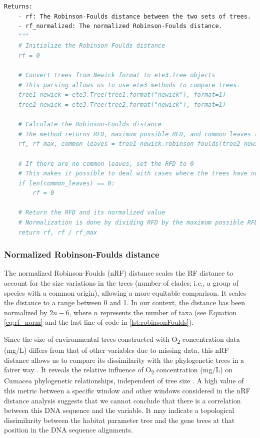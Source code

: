 {\begin{lstlisting}[label=lst:robinsonFoulds,language=Python,caption=Python script for calculating the Robinson-Foulds Distance using the ete3 package in the aPhyloGeo package.]
    Returns:
    - rf: The Robinson-Foulds distance between the two sets of trees.
    - rf_normalized: The normalized Robinson-Foulds distance.
    """
    # Initialize the Robinson-Foulds distance
    rf = 0

    # Convert trees from Newick format to ete3.Tree objects
    # This parsing allows us to use ete3 methods to compare trees.
    tree1_newick = ete3.Tree(tree1.format("newick"), format=1)
    tree2_newick = ete3.Tree(tree2.format("newick"), format=1)

    # Calculate the Robinson-Foulds distance
    # The method returns RFD, maximum possible RFD, and common leaves (i.e., a taxa) between the trees.
    rf, rf_max, common_leaves = tree1_newick.robinson_foulds(tree2_newick, unrooted_trees=True)

    # If there are no common leaves, set the RFD to 0
    # This makes it possible to deal with cases where the trees have no overlapping taxa.
    if len(common_leaves) == 0:
        rf = 0

    # Return the RFD and its normalized value
    # Normalization is done by dividing RFD by the maximum possible RFD.
    return rf, rf / rf_max
\end{lstlisting}

\subsubsection{Normalized Robinson-Foulds distance}\label{RFnorm}
The normalized Robinson-Foulds (nRF) distance scales the RF distance to account for the size variations in the trees (number of clades; i.e., a group of species with a common origin), allowing a more equitable comparison. It scales the distance to a range between 0 and 1. In our context, the distance has been normalized by $2n-6$, where $n$ represents the number of taxa (see Equation \eqref{eq:rf_norm} and the last line of code in \autoref{lst:robinsonFoulds}).

Since the size of environmental trees constructed with O\textsubscript{2} concentration data (mg/L) differs from that of other variables due to missing data, this nRF distance allows us to compare its dissimilarity with the phylogenetic trees in a fairer way \citep{tahiri2018new, koshkarov_phylogeography_2022}. It reveals the relative influence of O\textsubscript{2} concentration (mg/L) on Cumacea phylogenetic relationships, independent of tree size \citep{tahiri2018new, koshkarov_phylogeography_2022}. A high value of this metric between a specific window and other windows considered in the nRF distance analysis suggests that we cannot conclude that there is a correlation between this DNA sequence and the variable. It may indicate a topological dissimilarity between the habitat parameter tree and the gene trees at that position in the DNA sequence alignments.

}
